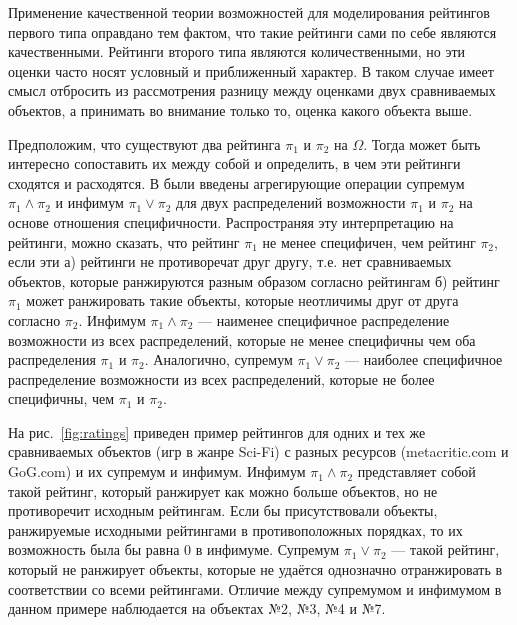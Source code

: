 \documentclass[twoside]{article}
\begin{document}
Применение качественной теории возможностей для моделирования рейтингов первого типа оправдано тем фактом, что такие рейтинги сами по себе являются качественными. Рейтинги второго типа являются количественными, но эти оценки часто носят условный и приближенный характер. В таком случае имеет смысл отбросить из рассмотрения разницу между оценками двух сравниваемых объектов, а принимать во внимание только то, оценка какого объекта выше.

Предположим, что существуют два рейтинга $\pi_1$ и $\pi_2$ на $\Omega$. Тогда может быть интересно сопоставить их между собой и определить, в чем эти рейтинги сходятся и расходятся. В \cite{Zubyuk21} были введены агрегирующие операции супремум $\pi_1\land\pi_2$ и инфимум $\pi_1\lor\pi_2$ для двух распределений возможности $\pi_1$ и $\pi_2$ на основе отношения специфичности. Распространяя эту интерпретацию на рейтинги, можно сказать, что рейтинг $\pi_1$ не менее специфичен, чем рейтинг $\pi_2$, если эти а) рейтинги не противоречат друг другу, т.е. нет сравниваемых объектов, которые ранжируются разным образом согласно рейтингам б) рейтинг $\pi_1$ может ранжировать такие объекты, которые неотличимы друг от друга согласно $\pi_2$. Инфимум $\pi_1\land\pi_2$ --- наименее специфичное распределение возможности из всех распределений, которые не менее специфичны чем оба распределения $\pi_1$ и $\pi_2$. Аналогично,  супремум $\pi_1\lor\pi_2$ --- наиболее специфичное распределение возможности из всех распределений, которые не более специфичны, чем $\pi_1$ и $\pi_2$.

На рис.~\ref{fig:ratings} приведен пример рейтингов для одних и тех же сравниваемых объектов (игр в жанре Sci-Fi) с разных ресурсов (metacritic.com и GoG.com) и их супремум и инфимум. Инфимум $\pi_1\land\pi_2$ представляет собой такой рейтинг, который ранжирует как можно больше объектов, но не противоречит исходным рейтингам. Если бы присутствовали объекты, ранжируемые исходными рейтингами в противоположных порядках, то их возможность была бы равна 0 в инфимуме. Супремум $\pi_1\lor\pi_2$ --- такой рейтинг, который не ранжирует объекты, которые не удаётся однозначно отранжировать в соответствии со всеми рейтингами. Отличие между супремумом и инфимумом в данном примере наблюдается на объектах №2, №3, №4 и №7.     
\end{document}
